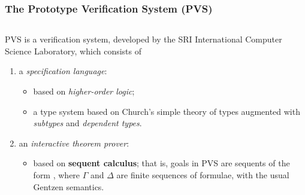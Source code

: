\documentclass[10pt]{beamer}
\begin{document}
\begin{frame}
\frametitle{ The Prototype Verification System (PVS)}
\begin{columns}
\begin{column}{10cm}

{\color{red} PVS} is a verification system, developed by the SRI International Computer Science Laboratory, which consists of

\begin{enumerate}

\item a \emph{\color{red} specification language}:


\begin{itemize}

\item based on \emph{higher-order logic};

\item a type system based on Church's simple theory of types
augmented with \emph{subtypes} and \emph{dependent types}.
\end{itemize}

\item an \emph{\color{red} interactive theorem prover}:

\begin{itemize}

\item based on {\bf sequent calculus}; that is, goals in PVS are
sequents of the form \boldmath{$\Gamma \vdash \Delta$}, where $\Gamma$ and
$\Delta$ are finite sequences of formulae, with the usual Gentzen
semantics.
\end{itemize}
\end{enumerate} 

\end{column}
\end{columns}
\end{frame}
\end{document}
